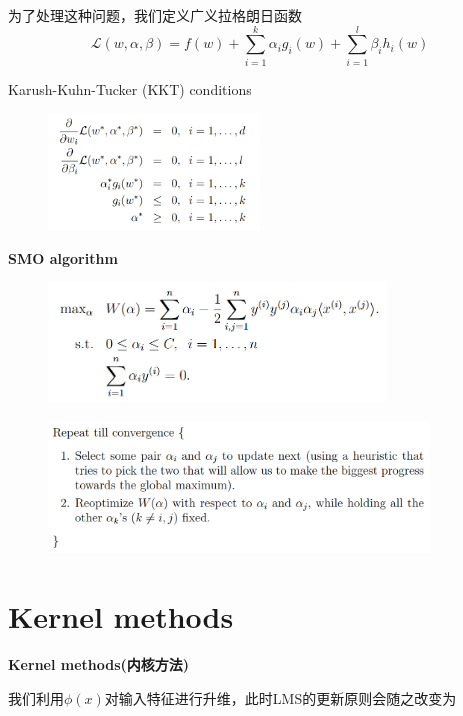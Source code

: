 \documentclass[12pt, a4paper, oneside]{ctexbook}
\begin{document}
为了处理这种问题，我们定义广义拉格朗日函数\[\mathcal{L}(w,\alpha,\beta)=f(w)+\sum_{i=1}^{k}\alpha_i g_i(w)+ \sum_{i=1}^{l}\beta_i h_i(w)\]

Karush-Kuhn-Tucker (KKT) conditions

  \begin{figure}[h]
		\centering 
		\includegraphics[width=0.5\textwidth]{images49.png} 
	\end{figure}


\textbf{SMO algorithm}

  \begin{figure}[h]
		\centering 
		\includegraphics[width=0.8\textwidth]{images50.png} 
	\end{figure}

  \begin{figure}[h]
		\centering 
		\includegraphics[width=0.9\textwidth]{images51.png} 
	\end{figure}


\section{Kernel methods}

\textbf{Kernel methods(内核方法)}

我们利用$\phi(x)$对输入特征进行升维，此时LMS的更新原则会随之改变为
\end{document}
